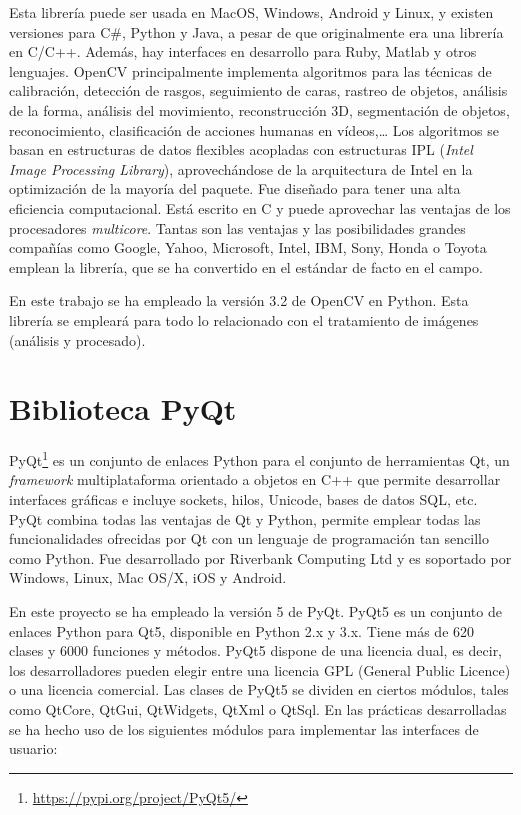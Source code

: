 Esta librería puede ser usada en MacOS, Windows, Android y Linux, y existen versiones para C\#, Python y Java, a pesar de que originalmente era una librería en C/C++. Además, hay interfaces en desarrollo para Ruby, Matlab y otros lenguajes.
OpenCV principalmente implementa algoritmos para las técnicas de calibración, detección de rasgos, seguimiento de caras, rastreo de objetos, análisis de la forma, análisis del movimiento, reconstrucción 3D, segmentación de objetos, reconocimiento, clasificación de acciones humanas en vídeos,…  Los algoritmos se basan en estructuras de datos flexibles acopladas con estructuras IPL (\textit{Intel Image Processing Library}), aprovechándose de la arquitectura de Intel en la optimización de la mayoría del paquete.
Fue diseñado para tener una alta eficiencia computacional. Está escrito en C y puede aprovechar las ventajas de los procesadores \textit{multicore}. Tantas son las ventajas y las posibilidades grandes compañías como Google, Yahoo, Microsoft, Intel, IBM, Sony, Honda o Toyota emplean la librería, que se ha convertido en el estándar de facto en el campo. 

En este trabajo se ha empleado la versión 3.2 de OpenCV en Python. Esta librería se empleará para todo lo relacionado con el tratamiento de imágenes (análisis y procesado). 

\section{Biblioteca PyQt}
PyQt\footnote{\url{https://pypi.org/project/PyQt5/}} es un conjunto de enlaces Python para el conjunto de herramientas Qt, un \textit{framework} multiplataforma orientado a objetos en C++  que permite desarrollar interfaces gráficas e incluye sockets, hilos, Unicode, bases de datos SQL, etc. PyQt combina todas las ventajas de Qt y Python, permite emplear todas las funcionalidades ofrecidas por Qt con un lenguaje de programación tan sencillo como Python. Fue desarrollado por Riverbank Computing Ltd y es soportado por Windows, Linux, Mac OS/X, iOS y Android.

En este proyecto se ha empleado la versión 5 de PyQt. PyQt5 es un conjunto de enlaces Python para Qt5, disponible en Python 2.x y 3.x. Tiene más de 620 clases y 6000 funciones y métodos. PyQt5 dispone de una licencia dual, es decir, los desarrolladores pueden elegir entre una licencia GPL (General Public Licence) o una licencia comercial. 
Las clases de PyQt5 se dividen en ciertos módulos, tales como QtCore, QtGui, QtWidgets, QtXml o QtSql. En las prácticas desarrolladas se ha hecho uso de los siguientes módulos para implementar las interfaces de usuario:


